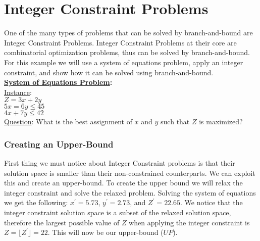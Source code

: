 \section{Integer Constraint Problems}
    One of the many types of problems that can be solved by 
    branch-and-bound are Integer Constraint Problems. 
    Integer Constraint Problems at their core are combinatorial 
    optimization problems, thus can be solved by branch-and-bound.
    For this example we will use a system of equations problem,
    apply an integer constraint, and show how it can be solved using 
    branch-and-bound. 
    \\ 
    \noindent
	\textbf{\underline{System of Equations Problem}:}\\
	\underline{Instance}: \\ $Z = 3x + 2y$  \\ $5x = 6y \leq 45$ \\ $4x + 7y \leq 42 $ \\
	\underline{Question}: What is the best assignment of $x$ and $y$ such that $Z$ is maximized?
    \\

        \subsubsection{Creating an Upper-Bound}
        First thing we must notice about Integer Constraint problems is that
        their solution space is smaller than their non-constrained counterparts.
        We can exploit this and create an upper-bound. To create the upper bound
        we will relax the integer constraint and solve the relaxed problem.
        Solving the system of equations we get the following: $x^{'} = 5.73$, $y^{'} = 2.73$, 
        and $Z^{'} = 22.65$. We notice that the integer constraint solution
        space is a subset of the relaxed solution space, therefore the largest
        possible value of $Z$ when applying the integer constraint is 
        $ Z = \lfloor Z^{'} \rfloor = 22$. This will now be our upper-bound ($UP$).
